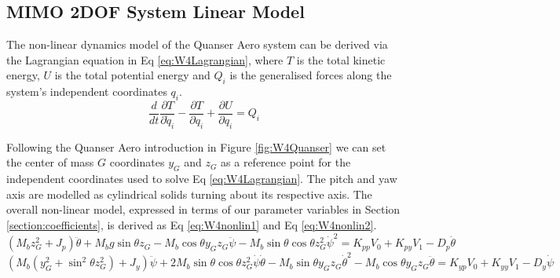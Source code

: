 \documentclass[11pt]{article}
\begin{document}
\subsection{MIMO 2DOF System Linear Model}
The non-linear dynamics model of the Quanser Aero system can be derived via the Lagrangian equation in Eq \ref{eq:W4Lagrangian}, where $T$ is the total kinetic energy, $U$ is the total potential energy and $Q_i$ is the generalised forces along the system's independent coordinates $q_i$. 
\begin{equation*}\label{eq:W4Lagrangian}
    \frac{d}{dt}\frac{\partial T}{\partial \dot{q}_i} - \frac{\partial T}{\partial q_i} + \frac{\partial U}{\partial q_i} = Q_i
\end{equation*}

Following the Quanser Aero introduction in Figure \ref{fig:W4Quanser} we can set the center of mass $G$ coordinates $y_G$ and $z_G$ as a reference point for the independent coordinates used to solve Eq \ref{eq:W4Lagrangian}. The pitch and yaw axis are modelled as cylindrical solids turning about its respective axis. The overall non-linear model, expressed in terms of our parameter variables in Section \ref{section:coefficients}, is derived as Eq \ref{eq:W4nonlin1} and Eq \ref{eq:W4nonlin2}.
\begin{equation}\label{eq:W4nonlin1}
    (M_b z^2_G + J_p)\ddot{\theta} + M_b g \sin \theta z_G - M_b\cos\theta y_G z_G \ddot{\psi} - M_b\sin \theta \cos\theta z^2_G \dot{\psi}^2 = K_{pp}V_0 + K_{py}V_1 - D_p \dot{\theta}
\end{equation}
\begin{equation}\label{eq:W4nonlin2}
    (M_b (y^2_G + \sin^2 \theta z^2_G) + J_y)\ddot{\psi} + 2M_b \sin \theta \cos \theta z^2_G \dot{\psi}\dot{\theta} - M_b\sin\theta y_G z_G \dot{\theta}^2 - M_b\cos\theta y_G z_G \ddot{\theta} = K_{yp}V_0 + K_{yy}V_1 - D_y \dot{\psi}
\end{equation}
\end{document}
